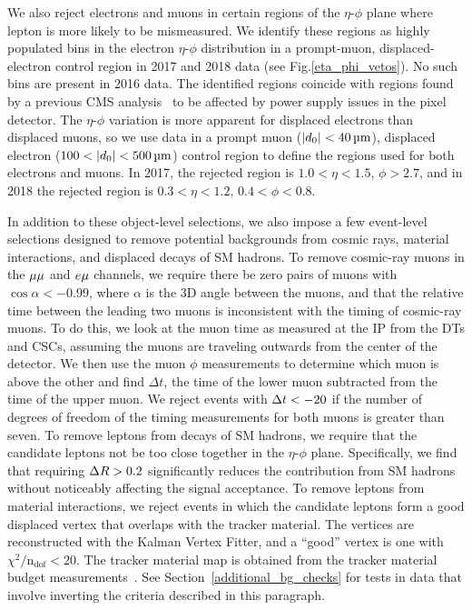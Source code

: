 

We also reject electrons and muons in certain regions of the $\eta$-$\phi$ plane where lepton \ad is more likely to be mismeasured. We identify these regions as highly populated bins in the electron $\eta$-$\phi$ distribution in a prompt-muon, displaced-electron control region in 2017 and 2018 data (see Fig.\ref{eta_phi_vetos}). No such bins are present in 2016 data. The identified regions coincide with regions found by a previous CMS analysis~\cite{disappearing_tracks} to be affected by power supply issues in the pixel detector. The $\eta$-$\phi$ variation is more apparent for displaced electrons than displaced muons, so we use data in a prompt muon ($\ad<\SI{40}{\um}$), displaced electron ($\num{100}<\ad<\SI{500}{\um}$) control region to define the  regions used for both electrons and muons. In 2017, the rejected region is $1.0<\eta<1.5$, $\phi>2.7$, and in 2018 the rejected region is $0.3<\eta<1.2$, $0.4<\phi<0.8$.



In addition to these object-level selections, we also impose a few event-level selections designed to remove potential backgrounds from cosmic rays, material interactions, and displaced decays of SM hadrons. To remove cosmic-ray muons in the ${\mu}{\mu}$ and $e{\mu}$ channels, we require there be zero pairs of muons with $\cos{\alpha}<-0.99$, where $\alpha$ is the 3D angle between the muons, and that the relative time between the leading two muons is inconsistent with the timing of cosmic-ray muons. To do this, we look at the muon time as measured at the IP from the DTs and CSCs, assuming the muons are traveling outwards from the center of the detector. We then use the muon $\phi$ measurements to determine which muon is above the other and find $\Delta t$, the time of the lower muon subtracted from the time of the upper muon. We reject events with $\Delta t< -20\ns$ if the number of degrees of freedom of the timing measurements for both muons is greater than seven. To remove leptons from decays of SM hadrons, we require that the candidate leptons not be too close together in the $\eta$-$\phi$ plane. Specifically, we find that requiring $\Delta R>0.2$ significantly reduces the contribution from SM hadrons without noticeably affecting the signal acceptance. To remove leptons from material interactions, we reject events in which the candidate leptons form a good displaced vertex that overlaps with the tracker material. The vertices are reconstructed with the Kalman Vertex Fitter, and a ``good'' vertex is one with $\chi^{2}/\mathrm{n_{dof}}< 20$. The tracker material map is obtained from the tracker material budget measurements~\cite{Sirunyan:2018icq,CMS-DP-2019-001}. See Section~\ref{additional_bg_checks} for tests in data that involve inverting the criteria described in this paragraph. 

